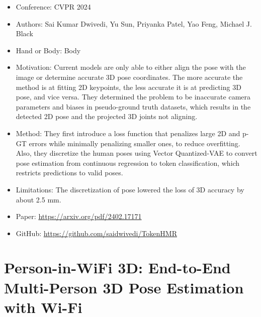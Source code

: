 \documentclass{article}
\begin{document}
\begin{itemize}
    \item Conference: CVPR 2024
    \item Authors: Sai Kumar Dwivedi, Yu Sun, Priyanka Patel, Yao Feng, Michael J. Black
    \item Hand or Body: Body
    \item Motivation: Current models are only able to either align the pose with the image or determine accurate 3D pose coordinates. The more accurate the method is at fitting 2D keypoints, the less accurate it is at predicting 3D pose, and vice versa. They determined the problem to be inaccurate camera parameters and biases in pseudo-ground truth datasets, which results in the detected 2D pose and the projected 3D joints not aligning.
    \item Method: They first introduce a loss function that penalizes large 2D and p-GT errors while minimally penalizing smaller ones, to reduce overfitting. Also, they discretize the human poses using Vector Quantized-VAE to convert pose estimation from continuous regression to token classification, which restricts predictions to valid poses.
    \item Limitations: The discretization of pose lowered the loss of 3D accuracy by about 2.5 mm.
    \item Paper: \url{https://arxiv.org/pdf/2402.17171}
    \item GitHub: \url{https://github.com/saidwivedi/TokenHMR}
\end{itemize}

\section*{Person-in-WiFi 3D: End-to-End Multi-Person 3D Pose Estimation with Wi-Fi}
\end{document}
